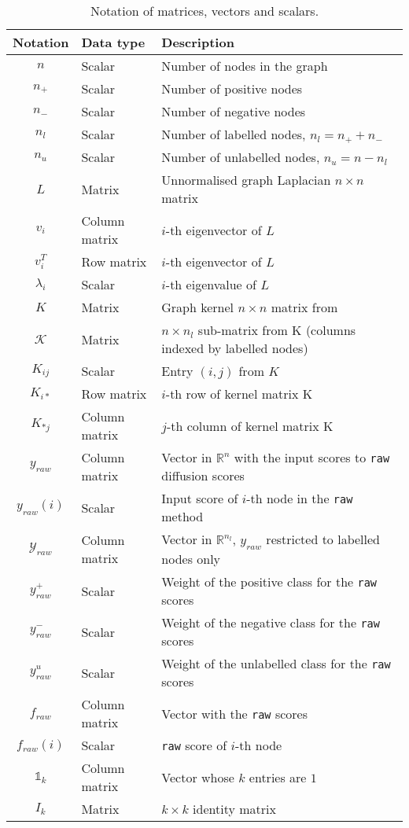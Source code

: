 \documentclass[12pt]{article}  %
\begin{document}
\begin{table}[ht]
\centering
\caption{Notation of matrices, vectors and scalars. }
\label{tab:notation-data}
\begin{tabular}{cll}
\hline
Notation & Data type & Description \\
\hline
$n$ & Scalar & Number of nodes in the graph \\
$n_+$ & Scalar & Number of positive nodes \\
$n_-$ & Scalar & Number of negative nodes \\
$n_l$ & Scalar & Number of labelled nodes, $n_l = n_+ + n_-$ \\
$n_u$ & Scalar & Number of unlabelled nodes, $n_u = n - n_l$ \\
$L$ & Matrix & Unnormalised graph Laplacian $n \times n$ matrix \\
$v_i$ & Column matrix & $i$-th eigenvector of $L$ \\
$v_i^T$ & Row matrix & $i$-th eigenvector of $L$ \\
$\lambda_i$ & Scalar & $i$-th eigenvalue of $L$ \\
$K$ & Matrix & Graph kernel $n \times n$ matrix from \cite{smola2003kernels} \\
$\mathcal{K}$ & Matrix & $n \times n_l$ sub-matrix from K (columns indexed by labelled nodes)\\
$K_{ij}$ & Scalar & Entry $(i,j)$ from $K$ \\
$K_{i*}$ & Row matrix & $i$-th row of kernel matrix K \\
$K_{*j}$ & Column matrix & $j$-th column of kernel matrix K \\
$y_{raw}$ & Column matrix & Vector in $\mathds{R}^n$ with the input scores to \texttt{raw} diffusion scores \\
$y_{raw}(i)$ & Scalar & Input score of $i$-th node in the \texttt{raw} method \\
$\mathcal{Y}_{raw}$ & Column matrix & Vector in $\mathds{R}^{n_l}$, $y_{raw}$ restricted to labelled nodes only \\
$y_{raw}^+$ & Scalar & Weight of the positive class for the \texttt{raw} scores \\
$y_{raw}^-$ & Scalar & Weight of the negative class for the \texttt{raw} scores \\
$y_{raw}^u$ & Scalar & Weight of the unlabelled class for the \texttt{raw} scores \\
$f_{raw}$ & Column matrix & Vector with the \texttt{raw} scores \\
$f_{raw}(i)$ & Scalar & \texttt{raw} score of $i$-th node \\
$\mathbb{1}_k$ & Column matrix & Vector whose $k$ entries are $1$ \\
$I_k$ & Matrix & $k \times k$ identity matrix \\
\hline
\end{tabular}
\end{table}
\end{document}

